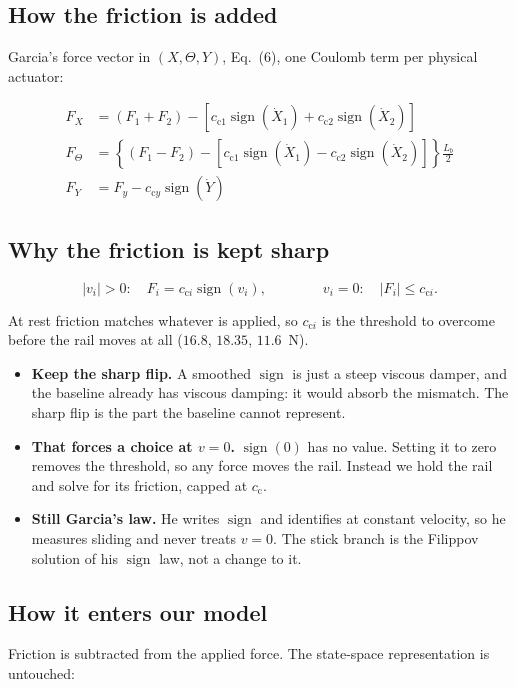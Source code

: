 \documentclass[12pt]{article}
\DeclareMathOperator{\sign}{sign}
\newcommand{\cc}{c_{\mathrm{c}}}
\newcommand{\panel}[1]{\subsection*{\Large #1}\vspace{1mm}}
\begin{document}
\panel{How the friction is added}

Garcia's force vector in $(X,\Theta,Y)$, Eq.~(6), one Coulomb term per physical actuator:

\begin{align*}
F_X&=(F_1+F_2)-\left[c_{\mathrm{c}1}\sign(\dot X_1)+c_{\mathrm{c}2}\sign(\dot X_2)\right]\\
F_\Theta&=\left\{(F_1-F_2)-\left[c_{\mathrm{c}1}\sign(\dot X_1)-c_{\mathrm{c}2}\sign(\dot X_2)\right]\right\}\tfrac{L_b}{2}\\
F_Y&=F_y-c_{\mathrm{c}y}\sign(\dot Y)
\end{align*}

\newpage
\panel{Why the friction is kept sharp}

\begin{equation*}
|v_i|>0:\quad F_i=c_{\mathrm{c}i}\sign(v_i),
\qquad\qquad
v_i=0:\quad |F_i|\le c_{\mathrm{c}i}.
\end{equation*}
\vspace{-4mm}

At rest friction matches whatever is applied, so $c_{\mathrm{c}i}$ is the threshold to overcome
before the rail moves at all ($16.8$, $18.35$, $11.6$~N).

\begin{itemize}[itemsep=0.4mm,topsep=1mm]
\item \textbf{Keep the sharp flip.} A smoothed $\sign$ is just a steep viscous damper, and the
      baseline already has viscous damping: it would absorb the mismatch. The sharp flip is the
      part the baseline cannot represent.
\item \textbf{That forces a choice at $v=0$.} $\sign(0)$ has no value. Setting it to zero
      removes the threshold, so any force moves the rail. Instead we hold the rail and solve for
      its friction, capped at $\cc$.
\item \textbf{Still Garcia's law.} He writes $\sign$ and identifies at constant velocity, so he
      measures sliding and never treats $v=0$. The stick branch is the Filippov solution of
      his $\sign$ law, not a change to it.
\end{itemize}

\newpage
\panel{How it enters our model}

Friction is subtracted from the applied force. The state-space representation is untouched:
\end{document}
